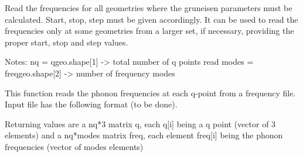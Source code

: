 \documentclass[letterpaper,10pt,english]{sphinxmanual}
\begin{document}

\begin{fulllineitems}
\label{pyqha:pyqha.read.read_freq_geo_old}
Read the frequencies for all geometries where the gruneisen parameters must be
calculated. Start, stop, step must be given accordingly. It can be used to read
the frequencies only at some geometries from a larger set, if necessary, 
providing the proper start, stop and step values.

Notes:
nq = qgeo.shape{[}1{]} -\textgreater{} total number of q points read
modes = freqgeo.shape{[}2{]} -\textgreater{} number of frequency modes

\end{fulllineitems}


\begin{fulllineitems}
\label{pyqha:pyqha.read.read_freq_old}
This function reads the phonon frequencies at each q-point from a frequency file.  
Input file has the following format (to be done).

Returning values are a nq*3 matrix q, each q{[}i{]} being a q point (vector of 3 elements)
and a nq*modes matrix freq, each element freq{[}i{]} being the phonon frequencies
(vector of modes elements)

\end{fulllineitems}

\end{document}
